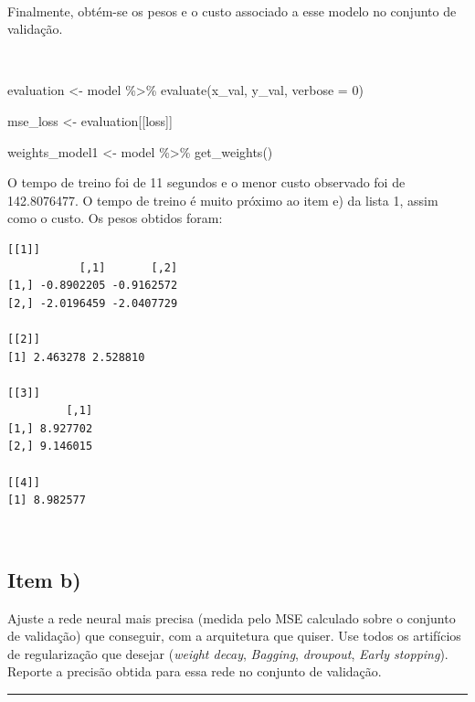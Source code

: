 \documentclass[
  a4paperpaper,
]{article}
\newenvironment{Shaded}{\begin{snugshade}}{\end{snugshade}}
\newcommand{\AttributeTok}[1]{\textcolor[rgb]{0.40,0.45,0.13}{#1}}
\newcommand{\DecValTok}[1]{\textcolor[rgb]{0.68,0.00,0.00}{#1}}
\newcommand{\FunctionTok}[1]{\textcolor[rgb]{0.28,0.35,0.67}{#1}}
\newcommand{\NormalTok}[1]{\textcolor[rgb]{0.00,0.23,0.31}{#1}}
\newcommand{\OtherTok}[1]{\textcolor[rgb]{0.00,0.23,0.31}{#1}}
\newcommand{\SpecialCharTok}[1]{\textcolor[rgb]{0.37,0.37,0.37}{#1}}
\newcommand{\StringTok}[1]{\textcolor[rgb]{0.13,0.47,0.30}{#1}}
\begin{document}
~

Finalmente, obtém-se os pesos e o custo associado a esse modelo no
conjunto de validação.

~

\begin{Shaded}
\begin{Highlighting}[]
\NormalTok{evaluation }\OtherTok{\textless{}{-}}\NormalTok{ model }\SpecialCharTok{\%\textgreater{}\%} \FunctionTok{evaluate}\NormalTok{(x\_val, y\_val, }\AttributeTok{verbose =} \DecValTok{0}\NormalTok{)}

\NormalTok{mse\_loss }\OtherTok{\textless{}{-}}\NormalTok{ evaluation[[}\StringTok{\textquotesingle{}loss\textquotesingle{}}\NormalTok{]]}

\NormalTok{weights\_model1 }\OtherTok{\textless{}{-}}\NormalTok{ model }\SpecialCharTok{\%\textgreater{}\%} \FunctionTok{get\_weights}\NormalTok{()}
\end{Highlighting}
\end{Shaded}

O tempo de treino foi de 11 segundos e o menor custo observado foi de
142.8076477. O tempo de treino é muito próximo ao item e) da lista 1,
assim como o custo. Os pesos obtidos foram:

\begin{verbatim}
[[1]]
           [,1]       [,2]
[1,] -0.8902205 -0.9162572
[2,] -2.0196459 -2.0407729

[[2]]
[1] 2.463278 2.528810

[[3]]
         [,1]
[1,] 8.927702
[2,] 9.146015

[[4]]
[1] 8.982577
\end{verbatim}

~

\subsection{Item b)}\label{item-b-1}

Ajuste a rede neural mais precisa (medida pelo MSE calculado sobre o
conjunto de validação) que conseguir, com a arquitetura que quiser. Use
todos os artifícios de regularização que desejar (\emph{weight decay},
\emph{Bagging}, \emph{droupout}, \emph{Early stopping}). Reporte a
precisão obtida para essa rede no conjunto de validação.

\begin{center}\rule{0.5\linewidth}{0.5pt}\end{center}

~
\end{document}
